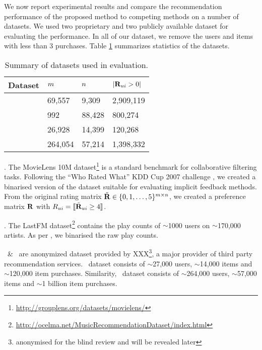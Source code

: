 We now report experimental results and compare the recommendation performance of the proposed method to competing methods on a number of datasets. We used two proprietary and two publicly available dataset for evaluating the performance. In all of our dataset, we remove the users and items with less than 3 purchases. Table \ref{tbl:datasets} summarizes statistics of the datasets.

\begin{table}
	\centering
	\caption{Summary of datasets used in evaluation.}
	\label{tbl:datasets}
	
	\begin{tabular}{llll}
	\toprule
	\toprule	
	\textbf{Dataset} & $m$ & $n$ & $ | \mathbf{R}_{ui} > 0 | $ \\
	\toprule
	\MLens  & 69,557 & 9,309 & 2,909,119 \\
	\LastFM & 992 & 88,428 & 800,274\\
	\Guitar & 26,928 & 14,399 & 120,268 \\
	\Lowes & 264,054 & 57,214 & 1,398,332 \\
	\bottomrule
	\end{tabular}
\end{table}

\MLens. The MovieLens 10M dataset\footnote{\scriptsize \url{http://grouplens.org/datasets/movielens/}} is a standard benchmark for collaborative filtering tasks.
Following the ``Who Rated What'' KDD Cup 2007 challenge \citep{Bennett:2007}, we created a binarised version of the dataset suitable for evaluating implicit feedback methods.
From the original rating matrix $\tilde{\mathbf{R}} \in \{ 0, 1, \ldots, 5 \}^{m \times n}$, we created a preference matrix $\mathbf{R}$ with $R_{ui} = \llbracket \tilde{\mathbf{R}}_{ui} \geq 4 \rrbracket$.

\LastFM. The LastFM dataset\footnote{{\scriptsize \url{http://ocelma.net/MusicRecommendationDataset/index.html}}} \citep{Celma:2008} contains the play counts of $\sim$1000 users on $\sim$170,000 artists. As per \MLens, we binarised the raw play counts.


\Lowes\ \& \Guitar \ are anonymized dataset provided by XXX\footnote{{\scriptsize anonymised for the blind review and will be revealed later}}, a major provider of third party recommendation services. \Guitar \ dataset consists of $\sim$27,000 users, $\sim$14,000 items and $\sim$120,000 item purchases. Similarity, \Lowes \ dataset consists of $\sim$264,000 users, $\sim$57,000 items and $\sim$1 billion item purchases. 

